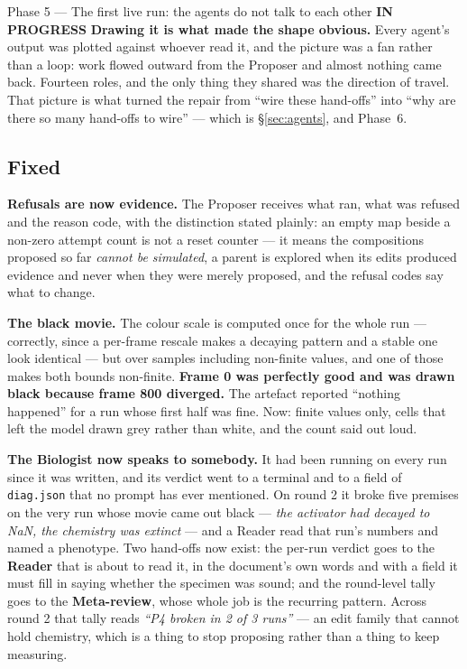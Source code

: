 \documentclass[11pt,a4paper]{article}
\newcommand{\code}[1]{\texttt{#1}}
\newcommand{\prog}{\textcolor{warn}{\textbf{IN PROGRESS}}}
\begin{document}
\begin{phasebox}{Phase 5 --- The first live run: the agents do not talk to each other \hfill \prog}
\textbf{Drawing it is what made the shape obvious.} Every agent's output was plotted against
whoever read it, and the picture was a fan rather than a loop: work flowed outward from the
Proposer and almost nothing came back. Fourteen roles, and the only thing they shared was the
direction of travel. That picture is what turned the repair from ``wire these hand-offs'' into
``why are there so many hand-offs to wire'' --- which is \S\ref{sec:agents}, and Phase~6.

\subsection*{Fixed}

\textbf{Refusals are now evidence.} The Proposer receives what ran, what was refused and the
reason code, with the distinction stated plainly: an empty map beside a non-zero attempt count is
not a reset counter --- it means the compositions proposed so far \emph{cannot be simulated}, a
parent is explored when its edits produced evidence and never when they were merely proposed, and
the refusal codes say what to change.

\textbf{The black movie.} The colour scale is computed once for the whole run --- correctly, since
a per-frame rescale makes a decaying pattern and a stable one look identical --- but over samples
including non-finite values, and one of those makes both bounds non-finite. \textbf{Frame 0 was
perfectly good and was drawn black because frame 800 diverged.} The artefact reported ``nothing
happened'' for a run whose first half was fine. Now: finite values only, cells that left the model
drawn grey rather than white, and the count said out loud.

\textbf{The Biologist now speaks to somebody.} It had been running on every run since it was
written, and its verdict went to a terminal and to a field of \code{diag.json} that no prompt has
ever mentioned. On round 2 it broke five premises on the very run whose movie came out black ---
\emph{the activator had decayed to NaN, the chemistry was extinct} --- and a Reader read that
run's numbers and named a phenotype. Two hand-offs now exist: the per-run verdict goes to the
\textbf{Reader} that is about to read it, in the document's own words and with a field it must
fill in saying whether the specimen was sound; and the round-level tally goes to the
\textbf{Meta-review}, whose whole job is the recurring pattern. Across round 2 that tally reads
\emph{``P4 broken in 2 of 3 runs''} --- an edit family that cannot hold chemistry, which is a thing
to stop proposing rather than a thing to keep measuring.


\end{phasebox}
\end{document}
